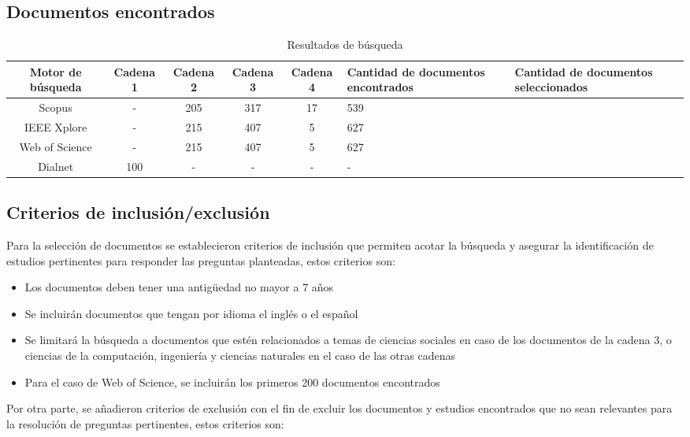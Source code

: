 \subsection{Documentos encontrados}

\begin{table}[H]
    \centering
    \begin{tabularx}{\textwidth}{|c|c|c|c|c|X|X|}
        \hline
        Motor de búsqueda  & Cadena 1 & Cadena 2 & Cadena 3 & Cadena 4 & Cantidad de documentos encontrados & Cantidad de documentos seleccionados \\ \hline
        Scopus & - &  205 & 317 & 17 & 539 & \\ \hline
        IEEE Xplore & - & 215 & 407 & 5 & 627 & \\ \hline
        Web of Science & - & 215 & 407 & 5 & 627 & \\ \hline
        Dialnet & 100 & - & - & - & - & \\ \hline
    \end{tabularx}
    \caption{Resultados de búsqueda}
    \label{tab:placeholder}
\end{table}

\subsection{Criterios de inclusión/exclusión}

Para la selección de documentos se establecieron criterios de inclusión que permiten acotar la búsqueda y asegurar la identificación de estudios pertinentes para responder las preguntas planteadas, estos criterios son:

\begin{itemize}
    \item Los documentos deben tener una antigüedad no mayor a 7 años
    \item Se incluirán documentos que tengan por idioma el inglés o el español
    \item Se limitará la búsqueda a documentos que estén relacionados a temas de ciencias sociales en caso de los documentos de la cadena 3, o ciencias de la computación, ingeniería y ciencias naturales en el caso de las otras cadenas
    \item Para el caso de Web of Science, se incluirán los primeros 200 documentos encontrados
\end{itemize}

Por otra parte, se añadieron criterios de exclusión con el fin de excluir los documentos y estudios encontrados que no sean relevantes para la resolución de preguntas pertinentes, estos criterios son:

